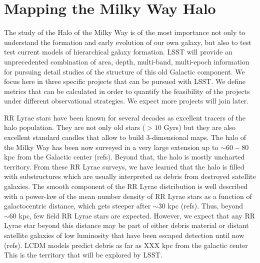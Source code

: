 %
%
%
%
%
%
%

\section{Mapping the Milky Way Halo}
\def\secname{MW_Halo}\label{sec:\secname} %


The study of the Halo of the Milky Way is of the most importance not only to understand
the formation and early evolution of our own galaxy, but also to test 
test current models of hierarchical galaxy formation. 
LSST will provide an unprecedented combination of
area, depth, multi-band, multi-epoch information for pursuing detail studies
of the structure of this old Galactic component. We focus here in three
specific projects that can be pursued with LSST. We define metrics that can
be calculated in order to quantify the feasibility of the projects under different 
observational strategies. We expect more projects will join later.

RR Lyrae stars have been known for several decades as excellent tracers
of the halo population. They are not only old stars ($>10$ Gyrs) but they are
also excellent standard candles that allow to build 3-dimensional maps. 
The halo of the Milky Way has been now surveyed in a very large extension up to 
$\sim 60-80$ kpc from the Galactic center (refs). Beyond that, the halo is
mostly uncharted territory.
From these RR Lyrae surveys, we have learned that the halo is filled with substructures
which are usually interpreted as debris from destroyed satellite galaxies. The smooth 
component of the RR Lyrae distribution is well described
with a power-law of the mean number density of RR Lyrae stars as a function of
galactocentric distance, which gets steeper after $\sim 30$ kpc (refs). 
Thus, beyond $\sim 60$ kpc, few field RR Lyrae stars are expected. However, we expect that 
any RR Lyrae star beyond this distance may be part of either debris material or distant
satellite galaxies of low luminosity that have been escaped detection until now (refs). 
LCDM models predict debris as far as XXX kpc from the galactic center
This is the territory that will be explored by LSST.

